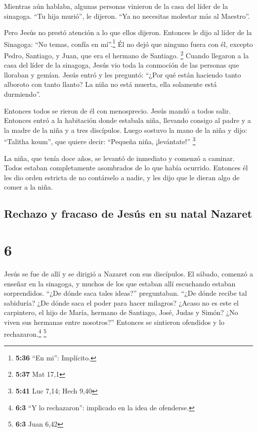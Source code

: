  Mientras aún hablaba, algunas personas vinieron de la
casa del líder de la sinagoga. ``Tu hija murió'', le dijeron. ``Ya no
necesitas molestar más al Maestro''.

 Pero Jesús no prestó atención a lo que ellos dijeron.
Entonces le dijo al líder de la Sinagoga: ``No temas, confía en
mí''.\footnote{\textbf{5:36} ``En mi'': Implícito.}  Él
no dejó que ninguno fuera con él, excepto Pedro, Santiago, y Juan, que
era el hermano de Santiago. \footnote{\textbf{5:37} Mat 17,1}
 Cuando llegaron a la casa del líder de la sinagoga,
Jesús vio toda la conmoción de las personas que lloraban y gemían.
 Jesús entró y les preguntó: ``¿Por qué están haciendo
tanto alboroto con tanto llanto? La niña no está muerta, ella solamente
está durmiendo''.

 Entonces todos se rieron de él con menosprecio. Jesús
mandó a todos salir. Entonces entró a la habitación donde estabala niña,
llevando consigo al padre y a la madre de la niña y a tres discípulos.
 Luego sostuvo la mano de la niña y dijo: ``Talitha
koum'', que quiere decir: ``Pequeña niña, ¡levántate!'' \footnote{\textbf{5:41}
  Luc 7,14; Hech 9,40}

 La niña, que tenía doce años, se levantó de inmediato y
comenzó a caminar. Todos estaban completamente asombrados de lo que
había ocurrido.  Entonces él les dio orden estricta de no
contárselo a nadie, y les dijo que le dieran algo de comer a la niña.

\hypertarget{rechazo-y-fracaso-de-jesuxfas-en-su-natal-nazaret}{%
\subsection{Rechazo y fracaso de Jesús en su natal
Nazaret}\label{rechazo-y-fracaso-de-jesuxfas-en-su-natal-nazaret}}

\hypertarget{section-5}{%
\section{6}\label{section-5}}

 Jesús se fue de allí y se dirigió a Nazaret con sus
discípulos.  El sábado, comenzó a enseñar en la sinagoga,
y muchos de los que estaban allí escuchando estaban sorprendidos. ``¿De
dónde saca tales ideas?'' preguntaban. ``¿De dónde recibe tal sabiduría?
¿De dónde saca el poder para hacer milagros?  ¿Acaso no es
este el carpintero, el hijo de María, hermano de Santiago, José, Judas y
Simón? ¿No viven sus hermanas entre nosotros?'' Entonces se sintieron
ofendidos y lo rechazaron.\footnote{\textbf{6:3} ``Y lo rechazaron'':
  implicado en la idea de ofenderse.} \footnote{\textbf{6:3} Juan 6,42}

